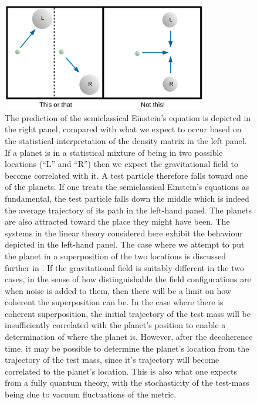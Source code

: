 \documentclass[aps,pra,showpacs,citeautoscript,amsmath,amssymb,floatfix,superscriptaddress,bbm, verbatim,amsfonts,changes,12pt,nofootinbib,longbibliography]{revtex4-2}
\begin{document}
\begin{figure}[h]
\includegraphics[width=0.8\textwidth]{notthis.png}
\caption{The prediction of the semiclassical Einstein's equation is depicted in the right panel, compared with what we expect to occur based on the statistical interpretation of the density matrix in the left panel. If a planet is in a statistical mixture of being in two possible locations (``L'' and ``R'') then we expect the gravitational field to become correlated with it. A test particle therefore falls toward one of the planets. If one treats the semiclassical Einstein's equations as fundamental, the test particle falls down the middle which is indeed the average trajectory of its path in the left-hand panel. The planets are also attracted toward the place they might have been. The systems in the linear theory considered here exhibit the behaviour depicted in the left-hand panel.
The case where we attempt to put the planet in a superposition of the two locations is discussed further in
\cite{layton2022semi,UCLcoherence}. If the gravitational field is suitably different in the two cases, in the sense of how distinguishable the field configurations  are when noise is added to them, then there will be a limit on how coherent the superposition can be\cite{UCLcoherence}. In the case where there is coherent superposition, the initial trajectory of the test mass will be insufficiently correlated with the planet's position to enable a determination of where the planet is. However, after the decoherence time, it may be possible to determine the planet's location from the trajectory of the test mass, since it's trajectory will become correlated to the planet's location\cite{layton2022semi}. This is also what one expects from a fully quantum theory, with the stochasticity of the test-mass being due to vacuum fluctuations of the metric. %
}
\label{fig:notthis}
\end{figure}
\end{document}
